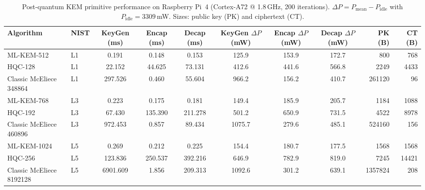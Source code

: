 \documentclass[10pt,twocolumn]{article}
\begin{document}
\onecolumn   %

\begin{table}[!ht]
\centering
\caption{Post-quantum KEM primitive performance on Raspberry Pi~4 (Cortex-A72 @ 1.8\,GHz, 200 iterations).
$\Delta P = P_\text{mean} - P_\text{idle}$ with $P_\text{idle} = 3309$\,mW.
Sizes: public key (PK) and ciphertext (CT).}
\label{tab:kem-primitives}
\footnotesize
\setlength{\tabcolsep}{3.5pt}
\begin{tabular}{@{}llS[table-format=4.3]S[table-format=3.3]S[table-format=3.3]S[table-format=4.1]S[table-format=3.1]S[table-format=3.1]rr@{}}
\toprule
{Algorithm} & {NIST} & {KeyGen (ms)} & {Encap (ms)} & {Decap (ms)} & {KeyGen $\Delta P$ (mW)} & {Encap $\Delta P$ (mW)} & {Decap $\Delta P$ (mW)} & {PK (B)} & {CT (B)} \\
\midrule
ML-KEM-512            & L1 &    0.191 &   0.148 &   0.153 &  125.9 & 153.9 & 172.7 &      800 &    768 \\
HQC-128               & L1 &   22.152 &  44.625 &  73.131 &  412.6 & 441.6 & 566.8 &    2249 &   4433 \\
Classic McEliece 348864 & L1 &  297.526 &   0.460 &  55.604 &  966.2 & 156.2 & 410.7 &  261120 &     96 \\
\midrule
ML-KEM-768            & L3 &    0.223 &   0.175 &   0.181 &  149.4 & 185.9 & 205.7 &    1184 &   1088 \\
HQC-192               & L3 &   67.430 & 135.390 & 211.278 &  501.2 & 650.9 & 731.5 &    4522 &   8978 \\
Classic McEliece 460896 & L3 &  972.453 &   0.857 &  89.434 & 1075.7 & 279.6 & 485.1 &  524160 &    156 \\
\midrule
ML-KEM-1024           & L5 &    0.269 &   0.212 &   0.225 &  154.4 & 180.7 & 177.5 &    1568 &   1568 \\
HQC-256               & L5 &  123.836 & 250.537 & 392.216 &  646.9 & 782.9 & 819.0 &    7245 &  14421 \\
Classic McEliece 8192128 & L5 & 6901.609 &   1.856 & 209.313 & 1092.6 & 301.2 & 639.1 & 1357824 &    208 \\
\bottomrule
\end{tabular}
\end{table}
\end{document}
